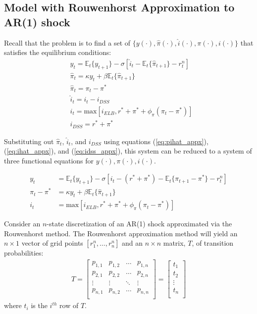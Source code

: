 \documentclass[11pt]{article}
\begin{document}
\begin{singlespace}
		\subsection{Model with Rouwenhorst Approximation to AR(1) shock}
		
		Recall that the problem is to find a set of $\{y(\cdot), \hat{\pi}(\cdot), \hat{i}(\cdot), \pi(\cdot), i(\cdot)\}$ that satisfies the equilibrium conditions: 
		\begin{align}
		& y_{t} = \mathbb{E}_t\{y_{t+1}\} - \sigma\left[\hat{i}_t - \mathbb{E}_t\{\hat{\pi}_{t+1}\}-r_t^n\right] \label{eq:EE_appx}\\
		& \hat{\pi}_{t} = \kappa y_t + \beta\mathbb{E}_t\{\hat{\pi}_{t+1}\}\label{eq:PC_appx}\\
		& \hat{\pi}_t = \pi_t - \pi^* \label{eq:pihat_appx}\\
		& \hat{i}_t = i_t - i_{DSS}  \label{eq:ihat_appx}\\
		& i_t = \text{max}\left[i_{ELB},r^* + \pi^* + \phi_{\pi}(\pi_t - \pi^*)\right]\label{eq:TR_appx}\\
		& i_{DSS} = r^* + \pi^* \label{eq:idss_appx}
		\end{align}
		
		Substituting out $\hat{\pi}_t$, $\hat{i}_t$, and $i_{DSS}$ using equations (\ref{eq:pihat_appx}), (\ref{eq:ihat_appx}), and (\ref{eq:idss_appx}), this system can be reduced to a system of three functional equations for $y(\cdot),\pi(\cdot), i(\cdot)$. 
		
		\begin{align}
		y_{t} &= \mathbb{E}_t\{y_{t+1}\} - \sigma\left[i_t - (r^* + \pi^*) - \mathbb{E}_t\{\pi_{t+1} - \pi^*\}-r_t^n\right] \\
		\pi_t - \pi^* &= \kappa y_t + \beta\mathbb{E}_t\{\hat{\pi}_{t+1}\}\\
		i_t &= \text{max}\left[i_{ELB},r^* + \pi^* + \phi_{\pi}(\pi_t - \pi^*)\right]
		\end{align}
		
		Consider an $n$-state discretization of an AR(1) shock approximated via the Rouwenhorst method. The Rouwenhorst approximation method will yield an $n \times 1$ vector of grid points $[r_1^n,\dots,r_n^n]$ and an $n \times n$ matrix, $T$, of transition probabilities: 
		\begin{align}
			T=
			\begin{bmatrix}
			p_{1,1} & p_{1,2} & \dots & p_{1,n} \\
			p_{2,1} & p_{2,2} & \dots & p_{2,n} \\
			\vdots & \vdots & \ddots & \vdots \\
			p_{n,1} & p_{n,2} & \dots & p_{n,n} \\
			\end{bmatrix}
			= 
			\begin{bmatrix}
			t_1 \\
			t_2 \\
			\vdots \\
			t_n  \\
			\end{bmatrix}
		\end{align}
		where $t_i$ is the $i^{th}$ row of $T$.
		

\end{singlespace}
\end{document}
